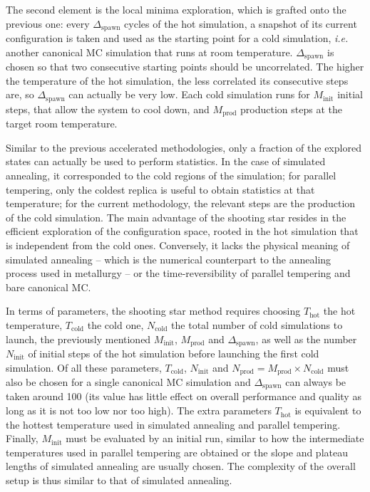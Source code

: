 \documentclass[main.tex]{subfiles}
\begin{document}
The second element is the local minima exploration, which is grafted onto the previous one: every $\Delta_{\text{spawn}}$ cycles of the hot simulation, a snapshot of its current configuration is taken and used as the starting point for a cold simulation, \textit{i.e.} another canonical MC simulation that runs at room temperature. $\Delta_{\text{spawn}}$ is chosen so that two consecutive starting points should be uncorrelated. The higher the temperature of the hot simulation, the less correlated its consecutive steps are, so $\Delta_{\text{spawn}}$ can actually be very low. Each cold simulation runs for $M_\text{init}$ initial steps, that allow the system to cool down, and $M_\text{prod}$ production steps at the target room temperature.

Similar to the previous accelerated methodologies, only a fraction of the explored states can actually be used to perform statistics. In the case of simulated annealing, it corresponded to the cold regions of the simulation; for parallel tempering, only the coldest replica is useful to obtain statistics at that temperature; for the current methodology, the relevant steps are the production of the cold simulation. The main advantage of the shooting star resides in the efficient exploration of the configuration space, rooted in the hot simulation that is independent from the cold ones. Conversely, it lacks the physical meaning of simulated annealing -- which is the numerical counterpart to the annealing process used in metallurgy -- or the time-reversibility of parallel tempering and bare canonical MC.

In terms of parameters, the shooting star method requires choosing $T_\text{hot}$ the hot temperature, $T_\text{cold}$ the cold one, $N_\text{cold}$ the total number of cold simulations to launch, the previously mentioned $M_\text{init}$, $M_\text{prod}$ and $\Delta_\text{spawn}$, as well as the number $N_\text{init}$ of initial steps of the hot simulation before launching the first cold simulation. Of all these parameters, $T_\text{cold}$, $N_\text{init}$ and $N_\text{prod} = M_\text{prod}\times N_\text{cold}$ must also be chosen for a single canonical MC simulation and $\Delta_\text{spawn}$ can always be taken around 100 (its value has little effect on overall performance and quality as long as it is not too low nor too high). The extra parameters $T_\text{hot}$ is equivalent to the hottest temperature used in simulated annealing and parallel tempering. Finally, $M_\text{init}$ must be evaluated by an initial run, similar to how the intermediate temperatures used in parallel tempering are obtained or the slope and plateau lengths of simulated annealing are usually chosen. The complexity of the overall setup is thus similar to that of simulated annealing.
\end{document}
